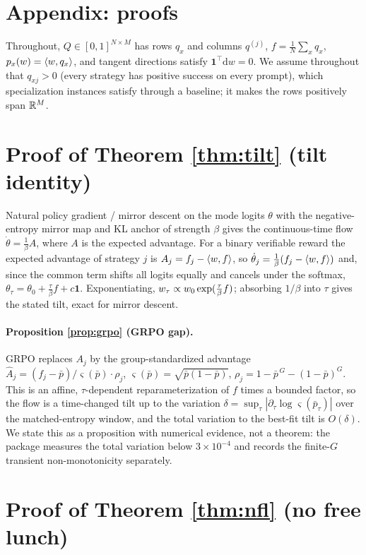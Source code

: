 \appendix
\section*{Appendix: proofs}

Throughout, $Q\in[0,1]^{N\times M}$ has rows $q_x$ and columns $q^{(j)}$,
$f=\tfrac1N\sum_x q_x$, $p_x(w)=\langle w, q_x\rangle$, and tangent directions satisfy
$\mathbf 1^\top\mathrm dw=0$. We assume throughout that $q_{xj}>0$ (every
strategy has positive success on every prompt), which specialization instances
satisfy through a baseline; it makes the rows positively span $\mathbb{R}^M$.

\section{Proof of Theorem \ref{thm:tilt} (tilt identity)}

Natural policy gradient / mirror descent on the mode logits $\theta$ with the
negative-entropy mirror map and KL anchor of strength $\beta$ gives the
continuous-time flow $\dot\theta=\tfrac1\beta A$, where $A$ is the expected
advantage. For a binary verifiable reward the expected advantage of strategy $j$
is $A_j=f_j-\langle w, f\rangle$, so $\dot\theta_j=\tfrac1\beta(f_j-\langle w, f\rangle)$ and, since
the common term shifts all logits equally and cancels under the softmax,
$\theta_\tau=\theta_0+\tfrac{\tau}{\beta}f+c\mathbf 1$. Exponentiating,
$w_\tau\propto w_0\exp(\tfrac{\tau}{\beta}f)$; absorbing $1/\beta$ into $\tau$ gives
the stated tilt, exact for mirror descent.

\paragraph{Proposition \ref{prop:grpo} (GRPO gap).} GRPO replaces $A_j$ by the
group-standardized advantage $\widehat A_j=(f_j-\bar p)/\varsigma(\bar
p)\cdot\rho_j$, $\varsigma(\bar p)=\sqrt{\bar p(1-\bar p)}$,
$\rho_j=1-\bar p^{\,G}-(1-\bar p)^{G}$. This is an affine, $\tau$-dependent
reparameterization of $f$ times a bounded factor, so the flow is a time-changed
tilt up to the variation $\delta=\sup_\tau|\partial_\tau\log\varsigma(\bar
p_\tau)|$ over the matched-entropy window, and the total variation to the best-fit
tilt is $O(\delta)$. We state this as a proposition with numerical evidence, not
a theorem: the package measures the total variation below $3\times10^{-4}$ and
records the finite-$G$ transient non-monotonicity separately.

\section{Proof of Theorem \ref{thm:nfl} (no free lunch)}

